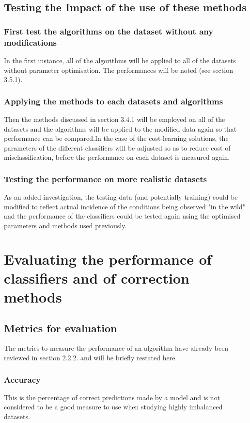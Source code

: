 \subsection{Testing the Impact of the use of these methods}
\subsubsection{First test the algorithms on the dataset without any modifications}
In the first instance, all of the algorithms will be applied to all of the datasets without parameter optimisation. The performances will be noted (see section 3.5.1). 

\subsubsection{Applying the methods to each datasets and algorithms}


Then the methods discussed in section 3.4.1 will be employed on all of the datasets and the algorithms will be applied to the modified data again so that performance can be compared.\newline In the case of the cost-learning solutions, the parameters of the different classifiers will be adjusted so as to reduce cost of misclassification, before the performance on each dataset is measured again.

\subsubsection{Testing the performance on more realistic datasets}
As an added investigation, the testing data (and potentially training) could be modified to reflect actual incidence of the conditions being observed "in the wild" and the performance of the classifiers could be tested again using the optimised parameters and methods used previously.

\section{Evaluating the performance of classifiers and of correction methods}

\subsection{Metrics for evaluation}  
The metrics to measure the performance of an algorithm have already been reviewed in section 2.2.2. and will be briefly restated here
\subsubsection{Accuracy}
This is the percentage of correct predictions made by a model and is not considered to be a good measure to use when studying highly imbalanced datasets.


